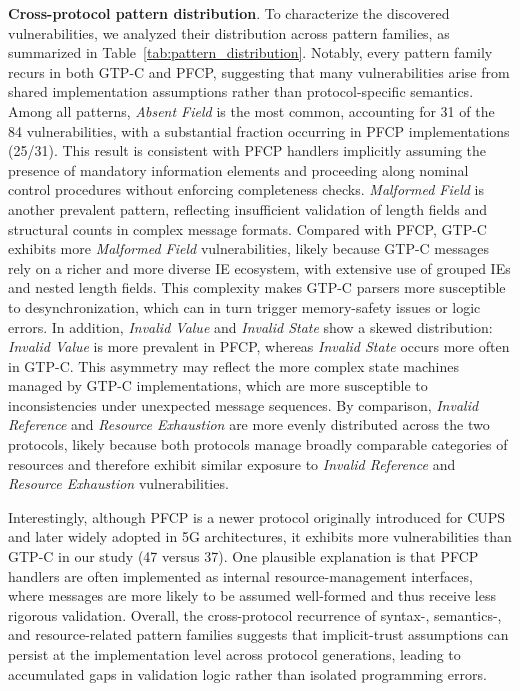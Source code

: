 \vspace{2pt}\noindent\textbf{Cross-protocol pattern distribution}. To characterize the discovered vulnerabilities, we analyzed their distribution across pattern families, as summarized in Table~\ref{tab:pattern_distribution}. Notably, every pattern family recurs in both GTP-C and PFCP, suggesting that many vulnerabilities arise from shared implementation assumptions rather than protocol-specific semantics.
Among all patterns, \textit{Absent Field} is the most common, accounting for 31 of the 84 vulnerabilities, with a substantial fraction occurring in PFCP implementations (25/31). This result is consistent with PFCP handlers implicitly assuming the presence of mandatory information elements and proceeding along nominal control procedures without enforcing completeness checks.
\textit{Malformed Field} is another prevalent pattern, reflecting insufficient validation of length fields and structural counts in complex message formats. Compared with PFCP, GTP-C exhibits more \textit{Malformed Field} vulnerabilities, likely because GTP-C messages rely on a richer and more diverse IE ecosystem, with extensive use of grouped IEs and nested length fields. This complexity makes GTP-C parsers more susceptible to desynchronization, which can in turn trigger memory-safety issues or logic errors.
In addition, \textit{Invalid Value} and \textit{Invalid State} show a skewed distribution: \textit{Invalid Value} is more prevalent in PFCP, whereas \textit{Invalid State} occurs more often in GTP-C. This asymmetry may reflect the more complex state machines managed by GTP-C implementations, which are more susceptible to inconsistencies under unexpected message sequences. By comparison, \textit{Invalid Reference} and \textit{Resource Exhaustion} are more evenly distributed across the two protocols, likely because both protocols manage broadly comparable categories of resources and therefore exhibit similar exposure to \textit{Invalid Reference} and \textit{Resource Exhaustion} vulnerabilities.

 
Interestingly, although PFCP is a newer protocol originally introduced for CUPS and later widely adopted in 5G architectures, it exhibits more vulnerabilities than GTP-C in our study (47 versus 37). One plausible explanation is that PFCP handlers are often implemented as internal resource-management interfaces, where messages are more likely to be assumed well-formed and thus receive less rigorous validation.
Overall, the cross-protocol recurrence of syntax-, semantics-, and resource-related pattern families suggests that implicit-trust assumptions can persist at the implementation level across protocol generations, leading to accumulated gaps in validation logic rather than isolated programming errors.


